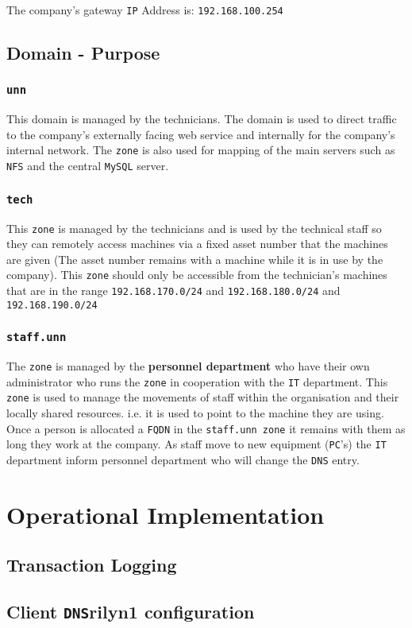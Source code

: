 \documentclass[11pt]{article}
\begin{document}
The company’s gateway \texttt{IP} Address is: \texttt{192.168.100.254}

\subsection{Domain - Purpose}

\subsubsection{\texttt{unn}}
This domain is managed by the technicians. The domain is used to direct traffic to the company’s externally facing web service and internally 
for the company’s internal network. The \texttt{zone} is also used for mapping of the main servers such as \texttt{NFS} and the central \texttt{MySQL} server. 

\subsubsection{\texttt{tech}}
This \texttt{zone} is managed by the technicians and is used by the technical staff so they can remotely access machines via a fixed asset number that 
the machines are given (The asset number remains with a machine while it is in use by the company). This \texttt{zone} should only be accessible from 
the technician’s machines that are in the range \texttt{192.168.170.0/24} and \texttt{192.168.180.0/24} and \texttt{192.168.190.0/24}

\subsubsection{\texttt{staff.unn}}
The \texttt{zone} is managed by the \textbf{personnel department} who have their own administrator who runs the \texttt{zone} in cooperation with the \texttt{IT} 
department. This \texttt{zone} is used to manage the movements of staff within the organisation and their locally shared resources. i.e. it is used to point 
to the machine they are using. Once a person is allocated a \texttt{FQDN} in the \texttt{staff.unn zone} it remains with them as long they work at the company. 
As staff move to new equipment (\texttt{PC}’s) the \texttt{IT} department inform personnel department who will change the \texttt{DNS} entry.

\section{Operational Implementation}
\subsection{Transaction Logging}
\subsection{Client \texttt{DNS}rilyn1
 configuration}
\end{document}
